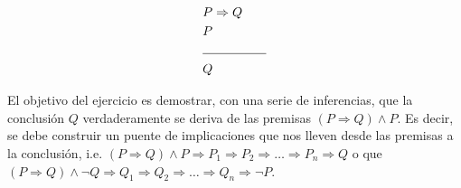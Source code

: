 \begin{equation*}
    \begin{split}
        & P \Rightarrow Q \\
        & P \\
        & \text{\noindent\rule{5em}{0.4pt}} \\
        & Q
    \end{split}
\end{equation*}

El objetivo del ejercicio es demostrar, con una serie de inferencias, que la conclusión $Q$ verdaderamente se deriva de las premisas $(P \Rightarrow Q) \wedge P$. Es decir, se debe construir un puente de implicaciones que nos lleven desde las premisas a la conclusión, i.e. $(P \Rightarrow Q) \wedge P \Rightarrow P_{1} \Rightarrow P_{2} \Rightarrow \ldots \Rightarrow P_{n} \Rightarrow Q$ o que $(P \Rightarrow Q) \wedge \neg Q \Rightarrow Q_{1} \Rightarrow Q_{2} \Rightarrow \ldots \Rightarrow Q_{n} \Rightarrow \neg P$.


\nocite{MGECED02}
\nocite{MGECED03}
\nocite{MGECED04}
\nocite{MGECED06}
\nocite{MGECED08}
\nocite{MGECED09}
\nocite{MGECED10}

\printbibliography[heading=subbibliography,title={Bibliografía}]